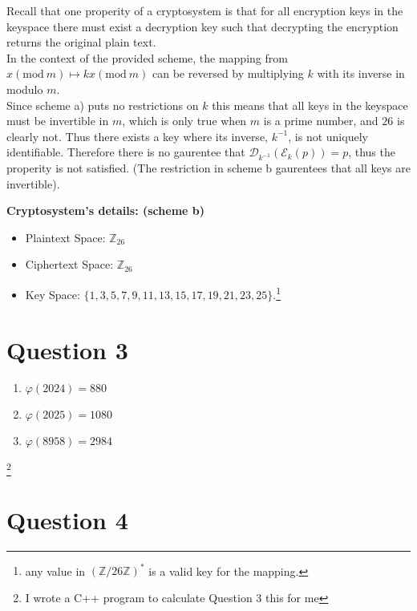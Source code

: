 \documentclass{article}
\makeatletter
\newcommand*{\currentname}{\TR@currentTitle}
\numberwithin{equation}{subsection}
\makeatother
\begin{document}
	Recall that one properity of a cryptosystem is that for all encryption keys in the keyspace there must exist a decryption key
	such that decrypting the encryption returns the original plain text.\\
	In the context of the provided scheme, the mapping from $x (\textrm{mod}\ m)\mapsto kx (\textrm{mod}\ m)$ can be reversed
	by multiplying $k$ with its inverse in modulo $m$.\\ 
	Since scheme a) puts no restrictions on $k$ this means that all keys in the keyspace must be invertible in $m$, which is only true
	when $m$ is a prime number, and $26$ is clearly not. Thus there exists a key where its inverse, $k^{-1}$, is not uniquely identifiable.
	Therefore there is no gaurentee that $\mathcal{D}_{k^{-1}} (\mathcal{E}_k(p)) = p$, thus the properity is not satisfied. (The restriction in scheme b gaurentees
	that all keys are invertible).

	\vspace{10pt}
	\textbf{Cryptosystem's details: (scheme b)}
	\begin{itemize}
		\item Plaintext Space: $\mathbb{Z}_{26}$
		\item Ciphertext Space: $\mathbb{Z}_{26}$
		\item Key Space: $\{1,3,5,7,9,11,13,15,17,19,21,23,25\}$.\quad \footnote{any value in $(\mathbb{Z}/26\mathbb{Z})^*$ is a valid key for the
			mapping.}
	\end{itemize}	

	\newpage

	\newpage
	\thispagestyle{fancy}

	\section*{Question 3 }	
	\begin{enumerate}
		\item $\varphi(2024) = 880$
		\item $\varphi(2025) = 1080$
		\item $\varphi(8958) = 2984$
	\end{enumerate}
	\footnote*{I wrote a C++ program to calculate Question 3 this for me}

	\vspace{30pt}
	\section*{Question 4}
	
\end{document}
